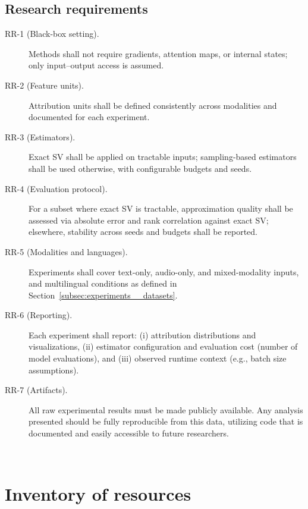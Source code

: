 \begin{appendices}
\begin{description}
    \end{description}

    \section{Research requirements}
    \label{subsec:requirements__research}

    \begin{description}

    \item[RR-1 (Black-box setting).] Methods shall not require gradients, attention maps, or internal states; only input--output access is assumed.

    \item[RR-2 (Feature units).] Attribution units shall be defined consistently across modalities and documented for each experiment.

    \item[RR-3 (Estimators).] Exact SV shall be applied on tractable inputs; sampling-based estimators shall be used otherwise, with configurable budgets and seeds.

    \item[RR-4 (Evaluation protocol).] For a subset where exact SV is tractable, approximation quality shall be assessed via absolute error and rank correlation against exact SV; elsewhere, stability across seeds and budgets shall be reported.

    \item[RR-5 (Modalities and languages).] Experiments shall cover text-only, audio-only, and mixed-modality inputs, and multilingual conditions as defined in Section~\ref{subsec:experiments__datasets}.

    \item[RR-6 (Reporting).] Each experiment shall report: (i) attribution distributions and visualizations, (ii) estimator configuration and evaluation cost (number of model evaluations), and (iii) observed runtime context (e.g., batch size assumptions).

    \item[RR-7 (Artifacts).] All raw experimental results must be made publicly available. Any analysis presented should be fully reproducible from this data, utilizing code that is documented and easily accessible to future researchers.

\end{description}

    \newpage \ \null\thispagestyle{empty}\newpage
    \chapter{Inventory of resources}
    \label{app:requirements_inventory}


\end{appendices}
